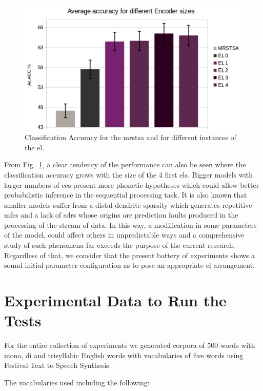 \documentclass{book}
\begin{document}
\begin{appendices}
\begin{figure}[h!]
    \centering
    \includegraphics[width=1.0\textwidth]{WordClassification3.png}
    \caption{Classification Accuracy for the \gls{mrstsa} and for different instances of the \gls{el}.}
    \label{fig:WordClassification3}
\end{figure}

From Fig.~\ref{fig:WordClassification3}, a clear tendency of the performance can also be seen where the classification accuracy grows with the size of the 4 first \glspl{el}. Bigger models with larger numbers of \glspl{cc} present more phonetic hypotheses which could allow better probabilistic inference in the sequential processing task. It is also known that smaller models suffer from a distal dendrite sparsity which generates repetitive \glspl{mfe} and a lack of \glspl{sdr} whose origins are prediction faults produced in the processing of the stream of data. In this way, a modification in some parameters of the model, could affect others in unpredictable ways and a comprehensive study of such phenomena far exceeds the purpose of the current research. Regardless of that, we consider that the present battery of experiments shows a sound initial parameter configuration as to pose an appropriate \gls{el} arrangement.

\section{Experimental Data to Run the Tests}

For the entire collection of experiments we generated corpora of 500 words with mono, di and trisyllabic English words with vocabularies of five words using Festival Text to Speech Synthesis.

The vocabularies used including the following:


\end{appendices}
\end{document}
